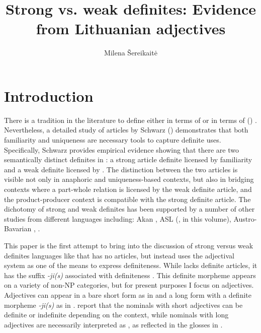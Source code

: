\documentclass[output=paper,
modfonts
]{langscibook}
\title{Strong vs. weak definites: Evidence from Lithuanian adjectives}
\author{Milena \v{S}ereikaitė \affiliation{University of Pennsylvania} 
}
\begin{document}
\maketitle

\section{Introduction} 
There is a tradition in the literature to define  either in terms of  \citep{Russell1905,Strawson1950,Frege1892,} or in terms of  () \citep{Christophersen1939,Kamp1981,Heim1982}. Nevertheless, a detailed study of  articles by Schwarz (\citeyear{Schwarz2009}) demonstrates that both familiarity and uniqueness are necessary tools to capture definite uses. Specifically, Schwarz provides empirical evidence showing that there are two semantically distinct definites in : a strong article definite licensed by familiarity and a weak definite licensed by . The distinction between the two articles is visible not only in anaphoric and uniqueness-based contexts, but also in bridging contexts where a part-whole relation is licensed by the weak definite article, and the product-producer context is compatible with the strong definite article. The dichotomy of strong and weak definites has been supported by a number of other studies from different languages including: Akan \citep{ArkohMatthewson2013}, ASL (\citealt{Irani2017}, in this volume), Austro-Bavarian \citep{Simonenko2014},  \citep{Ingason2016}.

This paper is the first attempt to bring into the discussion of strong versus weak definites languages like  that has no articles, but instead uses the adjectival system as one of the means to express definiteness. While  lacks definite articles, it has the suffix \textit{-ji(s)} associated with definiteness \citep{Ambrazas1997}. This definite morpheme appears on a variety of non-NP categories, but for present purposes I focus on adjectives. Adjectives can appear in a bare short form as in  and a long form with a definite morpheme \textit{-ji(s)} as in . \citet{GillonArmoskaite2015} report that the nominals with short adjectives can be definite or indefinite depending on the context, while nominals with long adjectives are necessarily interpreted as , as reflected in the glosses in .  
\end{document}
